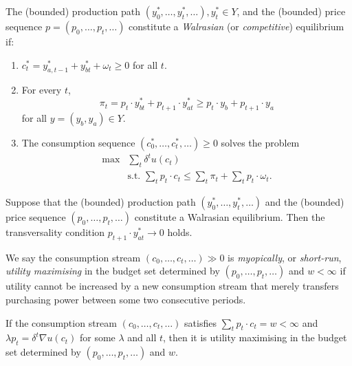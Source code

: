 \begin{defn}
    The (bounded) production path $(y^*_0, \dots, y^*_t, \dots), y^*_t \in Y$, and the (bounded) price sequence $p = (p_0, \dots, p_t, \dots)$ constitute a \emph{Walrasian} (or \emph{competitive}) equilibrium if:
    \begin{enumerate}
        \item 
        $c^*_t = y^*_{a, t - 1} + y^*_{bt} + \omega_t \geq 0$ for all $t$.

        \item 
        For every $t$,
        \begin{equation*}
            \pi_t = p_t \cdot y^*_{bt} + p_{t + 1} \cdot y^*_{at} \geq p_t \cdot y_b + p_{t + 1} \cdot y_a
        \end{equation*}
        for all $y = (y_b, y_a) \in Y$.

        \item 
        The consumption sequence $(c^*_0, \dots, c^*_t, \dots) \geq 0$ solves the problem
        \begin{equation*}
            \begin{aligned}
                \max &\sum_t \delta^t u(c_t) \\
                &\text{s.t. } \sum_t p_t \cdot c_t \leq \sum_t \pi_t + \sum_t p_t \cdot \omega_t.
            \end{aligned}
        \end{equation*}
    \end{enumerate}
\end{defn}

\begin{prop}
    Suppose that the (bounded) production path $(y^*_0, \dots, y^*_t, \dots)$ and the (bounded) price sequence $(p_0, \dots, p_t, \dots)$ constitute a Walrasian equilibrium. Then the transversality condition $p_{t + 1} \cdot y^*_{at} \to 0$ holds.
\end{prop}

\begin{defn}
    We say the consumption stream $(c_0, \dots, c_t, \dots) \gg 0$ is \emph{myopically}, or \emph{short-run}, \emph{utility maximising} in the budget set determined by $(p_0, \dots, p_t, \dots)$ and $w < \infty$ if utility cannot be increased by a new consumption stream that merely transfers purchasing power between some two consecutive periods.
\end{defn}

\begin{prop}
    If the consumption stream $(c_0, \dots, c_t, \dots)$ satisfies $\sum_t p_t \cdot c_t = w < \infty$ and $\lambda p_t = \delta^t \nabla u(c_t)$ for some $\lambda$ and all $t$, then it is utility maximising in the budget set determined by $(p_0, \dots, p_t, \dots)$ and $w$.
\end{prop}

